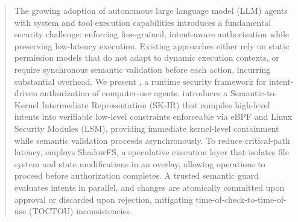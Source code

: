 \begin{abstract}
The growing adoption of autonomous large language model (LLM) agents with system and tool execution capabilities introduces a fundamental security challenge: enforcing fine-grained, intent-aware authorization while preserving low-latency execution. Existing approaches either rely on static permission models that do not adapt to dynamic execution contexts, or require synchronous semantic validation before each action, incurring substantial overhead. We present \SystemName, a runtime security framework for intent-driven authorization of computer-use agents. \SystemName introduces a Semantic-to-Kernel Intermediate Representation (SK-IR) that compiles high-level intents into verifiable low-level constraints enforceable via eBPF and Linux Security Modules (LSM), providing immediate kernel-level containment while semantic validation proceeds asynchronously. To reduce critical-path latency, \SystemName employs ShadowFS, a speculative execution layer that isolates file system and state modifications in an overlay, allowing operations to proceed before authorization completes. A trusted semantic guard evaluates intents in parallel, and changes are atomically committed upon approval or discarded upon rejection, mitigating time-of-check-to-time-of-use (TOCTOU) inconsistencies. 
\end{abstract}
